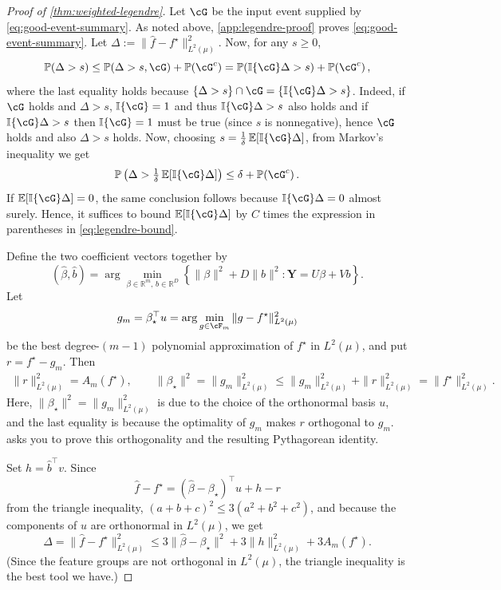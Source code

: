 \documentclass[11pt,twoside]{article}
\newcommand{\E}{\mathbb E}
\newcommand{\I}{\mathbb I}
\newcommand{\one}[1]{\I\{#1\}}
\renewcommand{\P}{\mathbb P}
\newcommand{\R}{\mathbb R}
\theoremstyle{definition}
\theoremstyle{remark}
\begin{document}
\begin{proof}[Proof of \cref{thm:weighted-legendre}]
Let $\cG$ be the input event supplied by \cref{eq:good-event-summary}.
As noted above, \cref{app:legendre-proof} proves
\cref{eq:good-event-summary}. Let $\Delta:=\|\widehat f-f^\star\|_{L^2(\mu)}^2$.
Now, for any $s\ge 0$,
\[
\P( \Delta>s ) \le \P( \Delta>s, \cG) + \P( \cG^c) = 
\P( \one{\cG}\Delta>s) + \P( \cG^c)\,,
\]
where the last equality holds because 
$\{\Delta>s\}\cap \cG = \{\one{\cG}\Delta>s\}$. 
Indeed,
if $\cG$ holds and $\Delta>s$, $\one{\cG}=1$ and thus $\one{\cG}\Delta>s$ also holds
and if $\one{\cG}\Delta>s$ then $\one{\cG}=1$ must be true (since $s$ is nonnegative),
hence $\cG$ holds and also $\Delta>s$ holds. 
Now, choosing 
$s = \tfrac{1}{\delta}\,\E[\one{\cG}\Delta]$,
from Markov's inequality we get
\[
\P\left( \Delta > \tfrac{1}{\delta}\,\E[\one{\cG}\Delta]\right) \le \delta+\P(\cG^c)\,.
\]
If $\E[\one{\cG}\Delta]=0$, the same conclusion follows because
$\one{\cG}\Delta=0$ almost surely. Hence, it suffices to bound
$\E[\one{\cG}\Delta]$ by $C$ times the expression in parentheses in
\cref{eq:legendre-bound}.

Define the two
coefficient vectors together by
\[
 (\widehat\beta,\widehat b)
 =\arg\min_{\beta\in\R^m,\,b\in\R^D}
 \left\{\|\beta\|^2+D\|b\|^2:
 \mathbf Y=U\beta+Vb\right\}.
\]
Let
\[
 g_m=\beta_\star^\top u
 =\arg\min_{g\in\cF_m}\|g-f^\star\|_{L^2(\mu)}^2
\]
be the best degree-$(m-1)$ polynomial approximation of $f^\star$ in
$L^2(\mu)$, and put $r=f^\star-g_m$. Then
\begin{align}
 \|r\|_{L^2(\mu)}^2=A_m(f^\star),\qquad
 \|\beta_\star\|^2=\|g_m\|_{L^2(\mu)}^2
 \le
 \|g_m\|_{L^2(\mu)}^2+\|r\|_{L^2(\mu)}^2=
 \|f^\star\|_{L^2(\mu)}^2. \label{eq:betastarbound}
\end{align}
Here, $\|\beta_\star\|^2=\|g_m\|_{L^2(\mu)}^2$ is due to the choice of the orthonormal basis $u$, and the last equality
is because the optimality of $g_m$ makes $r$ orthogonal to $g_m$.
 asks you to prove this orthogonality
and the resulting Pythagorean identity.

Set $h=\widehat b^\top v$. Since
\[
 \widehat f-f^\star
 =(\widehat\beta-\beta_\star)^\top u+h-r
\]
from the triangle inequality, $(a+b+c)^2 \le 3(a^2+b^2+c^2)$, 
and because the components of $u$ are orthonormal in $L^2(\mu)$, we get
\begin{equation}
 \Delta=\|\widehat f-f^\star\|_{L^2(\mu)}^2
 \le3\|\widehat\beta-\beta_\star\|^2
    +3\|h\|_{L^2(\mu)}^2+3A_m(f^\star).
 \label{eq:three-errors}
\end{equation}
(Since the feature groups are not orthogonal in $L^2(\mu)$, the triangle inequality is the best tool we have.)


\end{proof}
\end{document}
